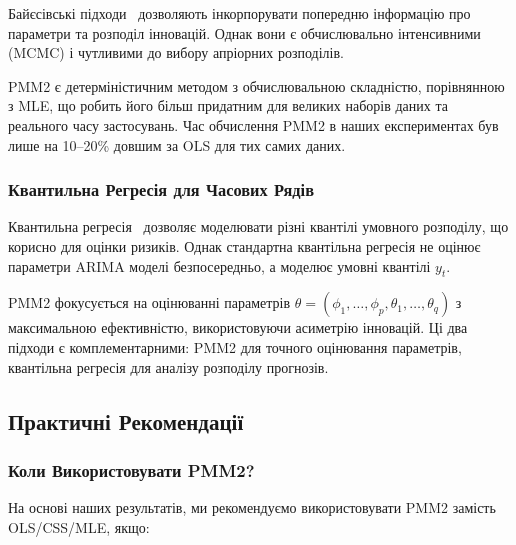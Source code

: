 \documentclass[12pt,a4paper]{article}
\begin{document}
	Байєсівські підходи~\cite{fruhwirth2006finite, nakajima2012generalized} дозволяють інкорпорувати попередню інформацію про параметри та розподіл інновацій. Однак вони є обчислювально інтенсивними (MCMC) і чутливими до вибору апріорних розподілів.
	
	PMM2 є детерміністичним методом з обчислювальною складністю, порівнянною з MLE, що робить його більш придатним для великих наборів даних та реального часу застосувань. Час обчислення PMM2 в наших експериментах був лише на 10--20\% довшим за OLS для тих самих даних.
	
	\subsubsection{Квантильна Регресія для Часових Рядів}
	
	Квантильна регресія~\cite{koenker2005quantile} дозволяє моделювати різні квантілі умовного розподілу, що корисно для оцінки ризиків. Однак стандартна квантільна регресія не оцінює параметри ARIMA моделі безпосередньо, а моделює умовні квантілі $y_t$.
	
	PMM2 фокусується на оцінюванні параметрів $\theta = (\phi_1, \ldots, \phi_p, \theta_1, \ldots, \theta_q)$ з максимальною ефективністю, використовуючи асиметрію інновацій. Ці два підходи є комплементарними: PMM2 для точного оцінювання параметрів, квантільна регресія для аналізу розподілу прогнозів.
	
	\subsection{Практичні Рекомендації}
	\label{subsec:practical_guidelines}
	
	\subsubsection{Коли Використовувати PMM2?}
	
	На основі наших результатів, ми рекомендуємо використовувати PMM2 замість OLS/CSS/MLE, якщо:
	
\end{document}
